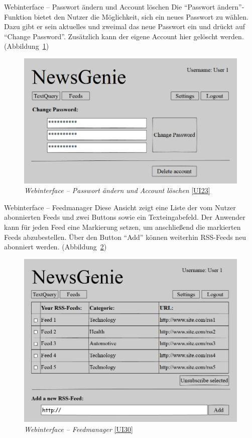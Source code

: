 \begin{ui}{23}{Webinterface -- Passwort ändern und Account löschen} 
Die "`Passwort ändern"'-Funktion bietet den Nutzer die Möglichkeit, sich ein neues Passwort zu wählen. Dazu gibt er sein aktuelles und zweimal das neue Passwort ein und drückt auf "`Change Password"'. Zusätzlich kann der eigene Account hier gelöscht werden. (Abbildung~\ref{fig:wi-cpw})
\begin{figure}[ht]
\centering
\includegraphics[width=0.8\linewidth]{figures/webinterfacePasswordChange.png}
\caption{\textit{Webinterface -- Passwort ändern und Account löschen} \ref{UI23}}
\label{fig:wi-cpw}
\end{figure}
\end{ui}


\begin{ui}{30}{Webinterface -- Feedmanager}
Diese Ansicht zeigt eine Liste der vom Nutzer abonnierten Feeds und zwei Buttons sowie ein Texteingabefeld. Der Anwender kann für jeden Feed eine Markierung setzen, um anschließend die markierten Feeds abzubestellen. Über den Button "`Add"' können weiterhin RSS-Feeds neu abonniert werden.
(Abbildung~\ref{fig:wi-feedman})
\begin{figure}[ht]
\centering
\includegraphics[width=0.8\linewidth]{figures/webinterfaceFeedManager.png}
\caption{\textit{Webinterface -- Feedmanager} \ref{UI30}}
\label{fig:wi-feedman}
\end{figure}
\end{ui}

